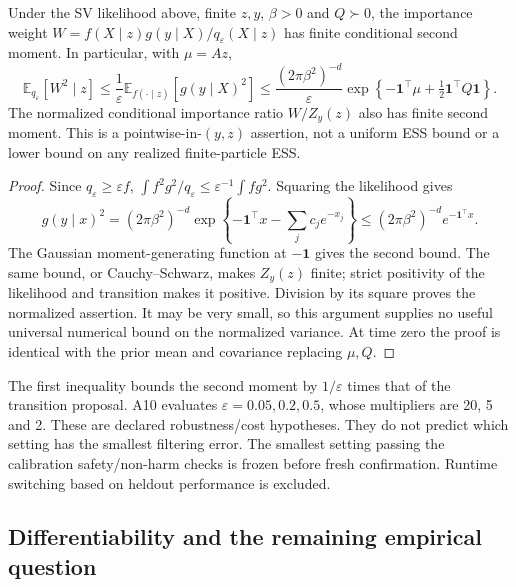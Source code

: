 \begin{proposition}
\label{prop:robust-second-moment}
Under the SV likelihood above, finite $z,y$, $\beta>0$ and $Q\succ0$,
the importance weight $W=f(X\mid z)g(y\mid X)/q_\varepsilon(X\mid z)$
has finite conditional second moment. In particular, with $\mu=Az$,
\begin{equation}
 \mathbb E_{q_\varepsilon}[W^2\mid z]
 \le \frac{1}{\varepsilon}\mathbb E_{f(\cdot\mid z)}[g(y\mid X)^2]
 \le \frac{(2\pi\beta^2)^{-d}}{\varepsilon}
 \exp\!\left\{-\boldsymbol1^\top\mu
                  +\tfrac12\boldsymbol1^\top Q\boldsymbol1\right\}.
 \label{eq:robust-second-moment}
\end{equation}
The normalized conditional importance ratio $W/Z_y(z)$ also has finite
second moment. This is a pointwise-in-$(y,z)$ assertion, not a uniform ESS
bound or a lower bound on any realized finite-particle ESS.
\end{proposition}
\begin{proof}
Since $q_\varepsilon\ge\varepsilon f$,
$\int f^2g^2/q_\varepsilon\le\varepsilon^{-1}\int fg^2$.
Squaring the likelihood gives
\[
 g(y\mid x)^2=(2\pi\beta^2)^{-d}
 \exp\!\left\{-\boldsymbol1^\top x-\sum_j c_j e^{-x_j}\right\}
 \le (2\pi\beta^2)^{-d}e^{-\boldsymbol1^\top x}.
\]
The Gaussian moment-generating function at $-\boldsymbol1$ gives the
second bound. The same bound, or Cauchy--Schwarz, makes $Z_y(z)$ finite;
strict positivity of the likelihood and transition makes it positive.
Division by its square proves the normalized assertion. It may be very
small, so this argument supplies no useful universal numerical bound on
the normalized variance. At time zero the proof is identical with the
prior mean and covariance replacing $\mu,Q$.
\end{proof}

The first inequality bounds the second moment by $1/\varepsilon$ times
that of the transition proposal. A10 evaluates $\varepsilon=0.05,0.2,0.5$,
whose multipliers are 20, 5 and 2. These are declared robustness/cost
hypotheses. They do not predict which setting has the smallest filtering
error. The smallest setting passing the calibration safety/non-harm checks
is frozen before fresh confirmation. Runtime switching based on heldout
performance is excluded.

\subsection{Differentiability and the remaining empirical question}

